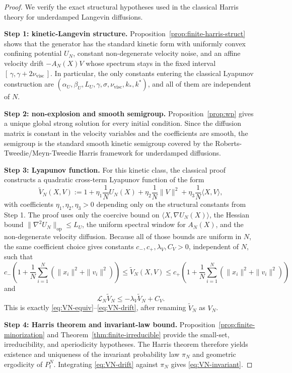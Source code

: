 \documentclass[11pt]{article}
\theoremstyle{definition}
\theoremstyle{remark}
\begin{document}
\begin{proof}
We verify the exact structural hypotheses used in the classical Harris theory
for underdamped Langevin diffusions.

\smallskip
\noindent
\textbf{Step 1: kinetic-Langevin structure.}
Proposition~\ref{prop:finite-harris-struct} shows that the generator has the
standard kinetic form with uniformly convex confining potential \(U_N\),
constant non-degenerate velocity noise, and an affine velocity drift
\(-A_N(X)V\) whose spectrum stays in the fixed interval
\([\,\gamma,\gamma+2\nu_{\mathrm{visc}}\,]\). In particular, the only constants
entering the classical Lyapunov construction are
\((\alpha_U,\beta_U,L_U,\gamma,\sigma,\nu_{\mathrm{visc}},k_*,k^*)\), and all
of them are independent of \(N\).

\smallskip
\noindent
\textbf{Step 2: non-explosion and smooth semigroup.}
Proposition~\ref{prop:wp} gives a unique global strong solution for every
initial condition. Since the diffusion matrix is constant in the velocity
variables and the coefficients are smooth, the semigroup is the standard smooth
kinetic semigroup covered by the Roberts-Tweedie/Meyn-Tweedie Harris framework
for underdamped diffusions.

\smallskip
\noindent
\textbf{Step 3: Lyapunov function.}
For this kinetic class, the classical proof constructs a quadratic cross-term
Lyapunov function of the form
\[
\widetilde V_N(X,V)
:=
1+\eta_1\frac1N U_N(X)
+\eta_2\frac1N\|V\|^2
+\eta_3\frac1N\langle X,V\rangle,
\]
with coefficients \(\eta_1,\eta_2,\eta_3>0\) depending only on the structural
constants from Step 1. The proof uses only the coercive bound on
\(\langle X,\nabla U_N(X)\rangle\), the Hessian bound
\(\|\nabla^2 U_N\|_{\mathrm{op}}\le L_U\), the uniform spectral window for
\(A_N(X)\), and the non-degenerate velocity diffusion. Because all of those
bounds are uniform in \(N\), the same coefficient choice gives constants
\(c_-,c_+,\lambda_V,C_V>0\), independent of \(N\), such that
\[
c_-\!\left(
1+\frac1N\sum_{i=1}^N(\|x_i\|^2+\|v_i\|^2)
\right)
\leq
\widetilde V_N(X,V)
\leq
c_+\!\left(
1+\frac1N\sum_{i=1}^N(\|x_i\|^2+\|v_i\|^2)
\right)
\]
and
\[
\mathcal L_N\widetilde V_N\leq -\lambda_V\widetilde V_N+C_V.
\]
This is exactly \eqref{eq:VN-equiv}--\eqref{eq:VN-drift}, after renaming
\(\widetilde V_N\) as \(V_N\).

\smallskip
\noindent
\textbf{Step 4: Harris theorem and invariant-law bound.}
Proposition~\ref{prop:finite-minorization} and
Theorem~\ref{thm:finite-irreducible} provide the small-set, irreducibility, and
aperiodicity hypotheses. The Harris theorem
\cite{meyn2012markov,roberts1996exponential} therefore yields existence and
uniqueness of the invariant probability law \(\pi_N\) and geometric ergodicity
of \(P_t^N\). Integrating \eqref{eq:VN-drift} against \(\pi_N\) gives
\eqref{eq:VN-invariant}.
\end{proof}
\end{document}
